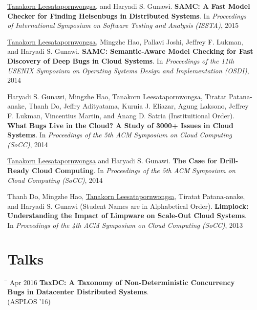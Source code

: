 \documentclass[10pt]{article} %
\begin{document}
\underline{Tanakorn Leesatapornwongsa}, and Haryadi S. Gunawi. \textbf{SAMC: A
Fast Model Checker for Finding Heisenbugs in Distributed Systems}. In
\textit{Proceedings of International Symposium on Software Testing and Analysis
(ISSTA)}, 2015
\vspace{2mm}

\underline{Tanakorn Leesatapornwongsa}, Mingzhe Hao, Pallavi Joshi, Jeffrey F.
Lukman, and Haryadi S. Gunawi. \textbf{SAMC: Semantic-Aware Model Checking for
Fast Discovery of Deep Bugs in Cloud Systems}. In \textit{Proceedings of the
11th USENIX Symposium on Operating Systems Design and Implementation (OSDI)},
2014
\vspace{2mm}

\newpage

Haryadi S. Gunawi, Mingzhe Hao, \underline{Tanakorn Leesatapornwongsa}, Tiratat
Patana-anake, Thanh Do, Jeffry Adityatama, Kurnia J. Eliazar, Agung Laksono,
Jeffrey F. Lukman, Vincentius Martin, and Anang D. Satria (Instituitional Order).
\textbf{What Bugs Live in the Cloud? A Study of 3000+ Issues in Cloud Systems}.
In \textit{Proceedings of the 5th ACM Symposium on Cloud Computing (SoCC)}, 2014
\vspace{2mm}

\underline{Tanakorn Leesatapornwongsa} and Haryadi S. Gunawi. \textbf{The Case
for Drill-Ready Cloud Computing}. In \textit{Proceedings of the 5th ACM
Symposium on Cloud Computing (SoCC)}, 2014
\vspace{2mm}

Thanh Do, Mingzhe Hao, \underline{Tanakorn Leesatapornwongsa}, Tiratat
Patana-anake, and Haryadi S. Gunawi (Student Names are in Alphabetical Order).
\textbf{Limplock: Understanding the Impact of Limpware on Scale-Out Cloud
Systems}. In \textit{Proceedings of the 4th ACM Symposium on Cloud Computing
(SoCC)}, 2013


\section{Talks}

\begin{tabbing}
\hspace{2.5cm} \= \kill
Apr 2016 \> \textbf{TaxDC: A Taxonomy of Non-Deterministic Concurrency Bugs in Datacenter Distributed Systems}. \\
\> (ASPLOS '16)
\end{tabbing}
\end{document}
